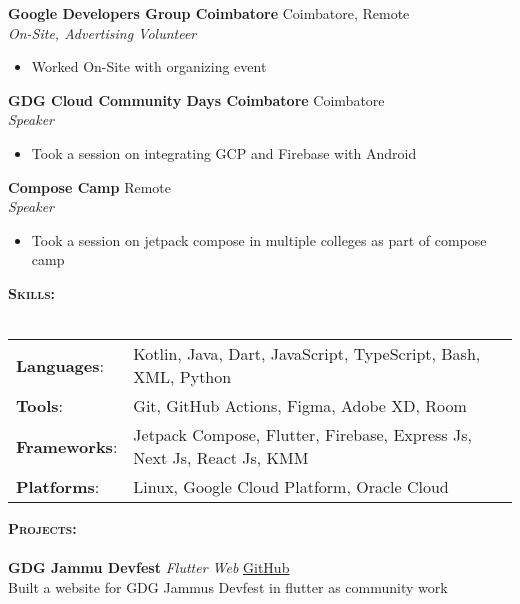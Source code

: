 \documentclass[a4paper]{article}
\newcommand{\lineunder} {
    \vspace*{-8pt} \\
    \hspace*{-18pt} \hrulefill \\
}
\newcommand{\header} [1] {
    {\hspace*{-18pt}\vspace*{6pt} \textsc{#1} }
    \vspace*{-6pt} \lineunder
}
\begin{document}
\textbf{Google Developers Group Coimbatore} \hfill Coimbatore, Remote\\
\textit{On-Site, Advertising Volunteer}\\
\vspace{-1mm}
\begin{itemize} \itemsep 1pt
	\item Worked On-Site with organizing event
\end{itemize}

\textbf{GDG Cloud Community Days Coimbatore} \hfill Coimbatore\\
\textit{Speaker}\\
\vspace{-1mm}
\begin{itemize} \itemsep 1pt
	\item Took a session on integrating GCP and Firebase with Android
\end{itemize}

\textbf{Compose Camp} \hfill Remote\\
\textit{Speaker}\\
\vspace{-1mm}
\begin{itemize} \itemsep 1pt
	\item Took a session on jetpack compose in multiple colleges as part of compose camp
\end{itemize}

\header{\textbf{Skills:}}
\begin{tabular}{ l l }
	{\textbf{Languages}}:  
        & Kotlin, Java, Dart, JavaScript, TypeScript, Bash, XML, Python          \\
	{\textbf{Tools}}:   
        & Git, GitHub Actions, Figma, Adobe XD, Room            \\
	{\textbf{Frameworks}}:
        & Jetpack Compose, Flutter, Firebase, Express Js, Next Js, React Js, KMM \\
	{\textbf{Platforms}}: 
        & Linux, Google Cloud Platform, Oracle Cloud                             \\
\end{tabular}
\vspace{2mm}

\header{ \textbf{Projects:}}
{\textbf{GDG Jammu Devfest}} {\sl Flutter Web}
    \hfill \href{https://github.com/GDG-Jammu}{GitHub}\\
    Built a website for GDG Jammu\textquotesingle{}s Devfest in flutter as community work\\
\vspace*{2mm}
\end{document}
